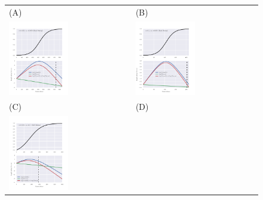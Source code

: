 \documentclass[11pt]{article}
\begin{document}
\begin{figure}[H]
	\centering
	\begin{tabular}{l|l}
		(A)&(B)\\
		\includegraphics[width=0.5\textwidth]{figures/decayFactors0}
		&\includegraphics[width=0.5\textwidth]{figures/decayFactors1}\\
		\hline(C)&(D)\\
		\includegraphics[width=0.5\textwidth]{figures/decayFactors2}

\end{tabular}
\end{figure}
\end{document}
